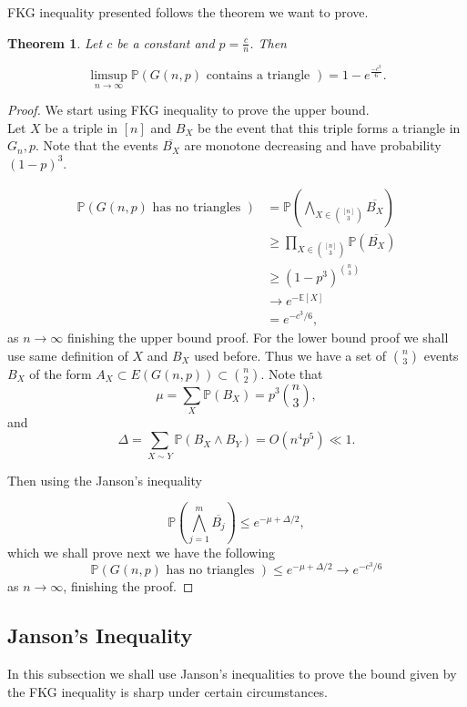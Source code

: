 \documentclass[12pt,twoside,a4paper,bibliography=totocnumbered]{book}
\numberwithin{equation}{section}
\newtheorem{theorem}             {Theorem}[section]
\theoremstyle{remark}
\begin{document}
FKG inequality presented follows the theorem we want to prove.
\begin{theorem} \label{theo:FKG}
Let $c$ be a constant and $p = \frac{c}{n}$. Then

$$ \limsup_{n \rightarrow \infty}\mathbb{P}(G(n,p)\text{ contains a triangle }) = 1 - e^{\frac{-c^3}{6}}.$$
\end{theorem}
\begin{proof}

We start using FKG inequality to prove the upper bound.\\
Let $X$ be a triple in $[n]$ and $B_X$ be the event that this triple forms a triangle in $G_n,p$. Note that the events $\overline{B_X}$ are monotone decreasing and have probability $(1-p)^3$.

\begin{align*}
\mathbb{P}(G(n,p) \text{ has no triangles }) &= \mathbb{P}\left( \bigwedge_{X \in \binom{[n]}{3}} \overline{B_X}\right) \\
& \geq \prod_{X \in \binom{[n]}{3}} \mathbb{P}(\overline{B_X})\\
& \geq (1-p^3)^{\binom{n}{3}}\\
& \rightarrow e^{-\mathbb{E}[X]}\\
& = e^{-c^3/6},
\end{align*}
as $n \rightarrow \infty$ finishing the upper bound proof. For the lower bound proof we shall use same definition of $X$ and $B_X$ used before. Thus we have a set of $\binom{n}{3}$ events $B_X$ of the form $A_X \subset E(G(n,p)) \subset \binom{n}{2}$.
Note that 
$$\mu = \sum_X \mathbb{P} (B_X) = p^3\binom {n}{3},$$
and
$$\Delta = \sum_{X\sim Y} \mathbb{P}(B_X \wedge B_Y) = O(n^4 p^5) \ll 1.$$

Then using the Janson's inequality 

$$ \mathbb{P}\left(\bigwedge_{j=1}^m \overline{B_j}\right) \leq e^{-\mu + \Delta/2}, $$
which we shall prove next we have the following 
$$ \mathbb{P}(G(n,p)\text{ has no triangles }) \leq e^{-\mu + \Delta/2} \rightarrow e^{-c^3/6}$$
as $n \rightarrow \infty$, finishing the proof.
\end{proof}

\subsection{Janson's Inequality}

In this subsection we shall use Janson's inequalities to prove the bound given by the FKG inequality is sharp under certain circumstances.
\end{document}
